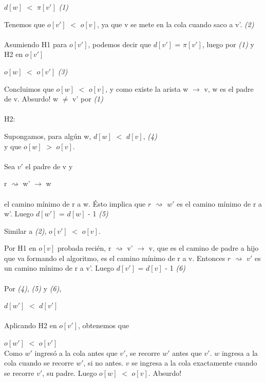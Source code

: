 \documentclass[11pt, a4paper, twoside]{article}
\begin{document}
$d[w]$ $<$ $\pi[v']$ \hfill\emph{(1)}

Tenemos que $o[v']$ $<$ $o[v]$, ya que v se mete en la cola cuando saco a v'. \hfill\emph{(2)}
\\\\Asumiendo H1 para $o[v']$, podemos decir que $d[v']$ = $\pi[v']$, luego por \emph{(1)} y H2 en $o[v']$

$o[w]$ $<$ $o[v']$ \hfill\emph{(3)}	

Concluimos que $o[w]$ $<$ $o[v]$, y como existe la arista w $\rightarrow$ v, w es el padre de v. Absurdo! w $\neq$ v' por \emph{(1)}
\\\\H2:

Supongamos, para algún w, $d[w]$ $<$ $d[v]$, \hfill\emph{(4)}
\\y que $o[w]$ $>$ $o[v]$.
\\\\Sea $v'$ el padre de v y 

r $\rightsquigarrow$ w' $\rightarrow$ w
\\\\el camino mínimo de r a w. Ésto implica que $r$ $\rightsquigarrow$ $w'$ es el camino mínimo de r a w'. Luego $d[w']$ = $d[w]$ - 1 \hfill\emph{(5)}

Similar a \emph{(2)}, $o[v']$ $<$ $o[v]$.

Por H1 en $o[v]$ probada recién, r $\rightsquigarrow$ v' $\rightarrow$ v, que es el camino de padre a hijo que va formando el algoritmo, es el camino mínimo de r a v. Entonces $r$ $\rightsquigarrow$ $v'$ es un camino mínimo de r a v'. Luego $d[v']$ = $d[v]$ - 1 \hfill\emph{(6)}
\\\\Por \emph{(4)}, \emph{(5)} y \emph{(6)},

$d[w']$ $<$ $d[v']$
\\\\Aplicando H2 en $o[v']$, obtenemos que

$o[w']$ $<$ $o[v']$
\\Como $w'$ ingresó a la cola antes que $v'$, se recorre $w'$ antes que $v'$. $w$ ingresa a la cola cuando se recorre $w'$, si no antes. $v$ se ingresa a la cola exactamente cuando se recorre $v'$, su padre. Luego $o[w]$ $<$ $o[v]$. Absurdo!
\end{document}
